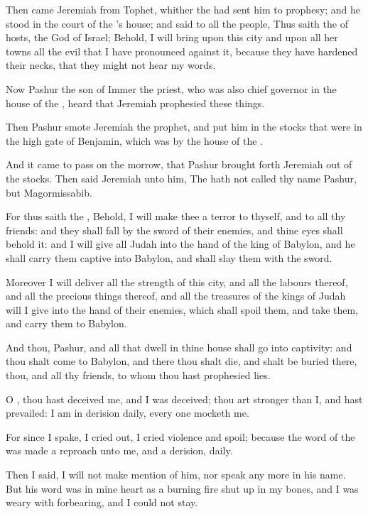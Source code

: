 \Verse Then came Jeremiah from Tophet, whither the \LORD had sent him to prophesy; and he stood in the court of the \LORD's house; and said to all the people, \Verse Thus saith the \LORD of hosts, the God of Israel; Behold, I will bring upon this city and upon all her towns all the evil that I have pronounced against it, because they have hardened their necks, that they might not hear my words.


\Chapter
\Verse Now Pashur the son of Immer the priest, who was also chief governor in the house of the \LORD, heard that Jeremiah prophesied these things.

\Verse Then Pashur smote Jeremiah the prophet, and put him in the stocks that were in the high gate of Benjamin, which was by the house of the \LORD.

\Verse And it came to pass on the morrow, that Pashur brought forth Jeremiah out of the stocks. Then said Jeremiah unto him, The \LORD hath not called thy name Pashur, but Magormissabib.

\Verse For thus saith the \LORD, Behold, I will make thee a terror to thyself, and to all thy friends: and they shall fall by the sword of their enemies, and thine eyes shall behold it: and I will give all Judah into the hand of the king of Babylon, and he shall carry them captive into Babylon, and shall slay them with the sword.

\Verse Moreover I will deliver all the strength of this city, and all the labours thereof, and all the precious things thereof, and all the treasures of the kings of Judah will I give into the hand of their enemies, which shall spoil them, and take them, and carry them to Babylon.

\Verse And thou, Pashur, and all that dwell in thine house shall go into captivity: and thou shalt come to Babylon, and there thou shalt die, and shalt be buried there, thou, and all thy friends, to whom thou hast prophesied lies.

\Verse O \LORD, thou hast deceived me, and I was deceived; thou art stronger than I, and hast prevailed: I am in derision daily, every one mocketh me.

\Verse For since I spake, I cried out, I cried violence and spoil; because the word of the \LORD was made a reproach unto me, and a derision, daily.

\Verse Then I said, I will not make mention of him, nor speak any more in his name. But his word was in mine heart as a burning fire shut up in my bones, and I was weary with forbearing, and I could not stay.

